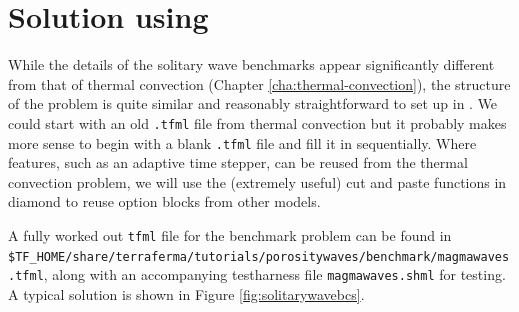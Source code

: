 \section{Solution using \TF}
\label{sec:solution-using-tf}

While the details of the solitary wave benchmarks appear significantly
different from that of thermal convection (Chapter
\ref{cha:thermal-convection}), the structure of the problem is quite
similar and reasonably straightforward to set up in \TF{}.  We could
start with an old \texttt{.tfml} file from thermal convection but it
probably makes more sense to begin with a blank \texttt{.tfml} file
and fill it in sequentially.  Where features, such as an adaptive time
stepper, can be reused from the thermal convection problem, we will
use the (extremely useful) cut and paste functions in diamond to reuse
option blocks from other models.

A fully worked out \texttt{tfml} file for the benchmark problem 
can be found in
\texttt{\$TF\_HOME/share/terraferma/tutorials/porositywaves/benchmark/magmawaves.tfml},
along with an accompanying testharness file \texttt{magmawaves.shml}
for testing.  A typical solution is shown in Figure \ref{fig:solitarywavebcs}.

